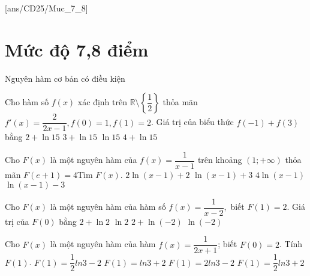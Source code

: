 [ans/CD25/Muc_7_8]
\setcounter{ex}{0}
\setcounter{dang}{0}
\section{Mức độ 7,8 điểm}
\begin{dang}
	{Nguyên hàm cơ bản có điều kiện}
\end{dang}      
\begin{ex}
	Cho hàm số $ f(x)$ xác định trên $\mathbb{R}\setminus\left\{\dfrac{1}{2}\right\}$ thỏa mãn $f'(x)=\dfrac{2}{2x-1},f(0)=1,f(1)=2$. Giá trị của biểu thức $ f\left(-1\right)+f(3)$ bằng
	\choice
	{$ 2+\ln 15$}
	{$ 3+\ln 15$}
	{\True $\ln 15$}
	{$ 4+\ln 15$}
\end{ex}
\begin{ex}
	Cho $ F(x)$ là một nguyên hàm của $ f(x)=\dfrac{1}{x-1}$ trên khoảng $\left(1;+\infty\right)$ thỏa mãn $ F\left(e+1\right)=4$Tìm $ F(x)$.
	\choice
	{$ 2\ln \left(x-1\right)+2$}
	{\True $\ln \left(x-1\right)+3$}
	{$ 4\ln \left(x-1\right)$}
	{$\ln \left(x-1\right)-3$}
\end{ex}
\begin{ex}
	Cho $F(x)$ là một nguyên hàm của hàm số $f(x)=\dfrac{1}{x-2},$ biết $F(1)=2.$ Giá trị của $F(0)$ bằng
	\choice
	{\True $ 2+\ln 2$}
	{$\ln 2$}
	{$ 2+\ln \left(-2\right)$}
	{$\ln \left(-2\right)$}
\end{ex}
\begin{ex}
	Cho $F(x)$ là một nguyên hàm của hàm $f(x)=\dfrac{1}{2x+1}$; biết $F(0)=2$. Tính $F(1)$.
	\choice
	{$F(1)=\dfrac{1}{2}ln3-2$}
	{$F(1)=ln3+2$}
	{$F(1)=2ln3-2$}
	{\True $F(1)=\dfrac{1}{2}ln3+2$}
\end{ex}
